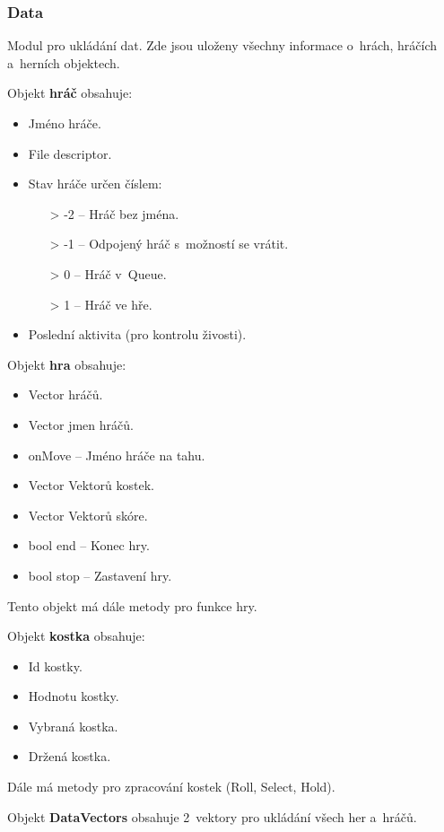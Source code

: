 \documentclass[12pt, a4paper]{article}
\begin{document}
\subsubsection{Data}
Modul pro ukládání dat.
Zde jsou uloženy všechny informace o~hrách, hráčích a~herních objektech.

Objekt \textbf{hráč} obsahuje:
\begin{itemize}
    \item Jméno hráče.
    \item File descriptor.
    \item Stav hráče určen číslem:
    \begin{itemize}
        \item[>] -2 -- Hráč bez jména.
        \item[>] -1 -- Odpojený hráč s~možností se vrátit.
        \item[>] 0 -- Hráč v~Queue.
        \item[>] 1 -- Hráč ve hře.
    \end{itemize}
    \item Poslední aktivita (pro kontrolu živosti).
\end{itemize}

\newpage
Objekt \textbf{hra} obsahuje:
\begin{itemize}
    \item Vector hráčů.
    \item Vector jmen hráčů.
    \item onMove -- Jméno hráče na tahu.
    \item Vector Vektorů kostek.
    \item Vector Vektorů skóre.
    \item bool end -- Konec hry.
    \item bool stop -- Zastavení hry.
\end{itemize}
Tento objekt má dále metody pro funkce hry.

Objekt \textbf{kostka} obsahuje:
\begin{itemize}
    \item Id kostky.
    \item Hodnotu kostky.
    \item Vybraná kostka.
    \item Držená kostka.
\end{itemize}
Dále má metody pro zpracování kostek (Roll, Select, Hold).

Objekt \textbf{DataVectors} obsahuje 2~vektory pro ukládání všech her a~hráčů.
\end{document}
